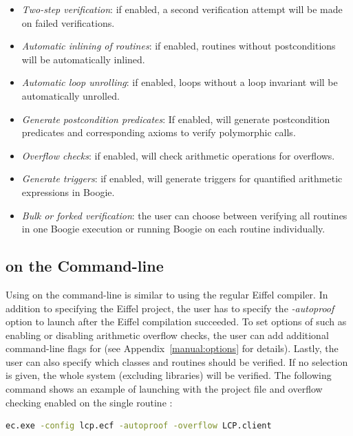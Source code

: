 \begin{itemize}
\item \emph{Two-step verification}: if enabled, a second verification attempt will be made on failed verifications.
\item \emph{Automatic inlining of routines}: if enabled, routines without postconditions will be automatically inlined.
\item \emph{Automatic loop unrolling}: if enabled, loops without a loop invariant will be automatically unrolled.
\item \emph{Generate postcondition predicates}: If enabled, \AutoProof will generate postcondition predicates and corresponding axioms to verify polymorphic calls.
\item \emph{Overflow checks}: if enabled, \AutoProof will check arithmetic operations for overflows.
\item \emph{Generate triggers}: if enabled, \AutoProof will generate triggers for quantified arithmetic expressions in Boogie.
\item \emph{Bulk or forked verification}: the user can choose between verifying all routines in one Boogie execution or running Boogie on each routine individually.
\end{itemize}


\subsection{\AutoProof on the Command-line}

Using \AutoProof on the command-line is similar to using the regular Eiffel compiler. In addition to specifying the Eiffel project, the user has to specify the \emph{-autoproof} option to launch \AutoProof after the Eiffel compilation succeeded. To set options of \AutoProof such as enabling or disabling arithmetic overflow checks, the user can add additional command-line flags for \AutoProof (see Appendix~\ref{manual:options} for details). Lastly, the user can also specify which classes and routines should be verified. If no selection is given, the whole system (excluding libraries) will be verified. The following command shows an example of launching \AutoProof with the project file  and overflow checking enabled on the single routine :

\begin{lstlisting}[language=bash]
ec.exe -config lcp.ecf -autoproof -overflow LCP.client
\end{lstlisting}

